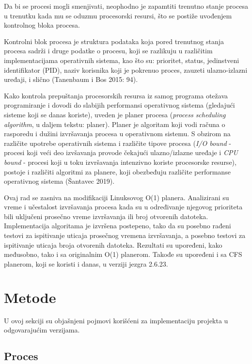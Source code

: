 Da bi se procesi mogli smenjivati, neophodno je zapamtiti trenutno stanje procesa u trenutku kada mu se oduzmu procesorski resursi, što se postiže uvođenjem kontrolnog bloka procesa.

Kontrolni blok procesa je struktura podataka koja pored trenutnog stanja procesa sadrži i druge podatke o procesu, koji se razlikuju u različitim implementacijama operativnih sistema, kao što su: prioritet, status, jedinstveni identifikator (PID), naziv korisnika koji je pokrenuo proces, zauzeti ulazno-izlazni uređaji, i slično (Tanenbaum i Bos 2015: 94).

\AuthorExHere

Kako kontrola prepuštanja procesorskih resursa iz samog programa otežava programiranje i dovodi do slabijih performansi operativnog sistema (gledajući sisteme koji se danas koriste), uveden je planer procesa (\emph{process scheduling algorithm}, u daljem tekstu: planer). Planer je algoritam koji vodi računa o rasporedu i dužini izvršavanja procesa u operativnom sistemu. S obzirom na različite upotrebe operativnih sistema i različite tipove procesa (\emph{I/O bound} - procesi koji veći deo izvšavanja provode čekajući ulazno/izlazne uređaje i \emph{CPU bound} - procesi koji u toku izvršavanja intenzivno koriste procesorske resurse), postoje i različiti algoritmi za planere, koji obezbeđuju različite performanse operativnog sistema (Šantavec 2019).

Ovaj rad se zasniva na modifikaciji Linuksovog O(1) planera. Analizirani su vreme i učestalost izvršavanja procesa kada su u određivanje njegovog prioriteta bili uključeni prosečno vreme izvršavanja ili broj otvorenih datoteka. Implementacija algoritama je izvršena postepeno, tako da su posebno rađeni testovi za ispitivanje uticaja prosečnog vremena izvršavanja, a posebno testovi za ispitivanje uticaja broja otvorenih datoteka. Rezultati su upoređeni, kako međusobno, tako i sa originalnim O(1) planerom. Takođe su upoređeni i sa CFS planerom, koji se koristi i danas, u verziji jezgra 2.6.23.

\section{Metode}

U ovoj sekciji su objašnjeni pojmovi korišćeni za implementaciju projekta u odgovarajućim verzijama.

\subsection{Proces}


